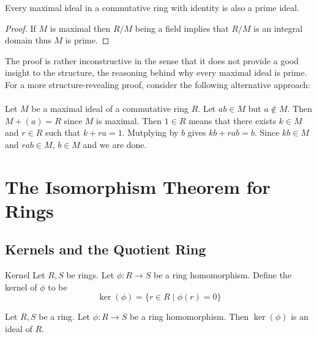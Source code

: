 \documentclass[a4paper]{article}
\begin{document}
\begin{crl}{}{} Every maximal ideal in a commutative ring with identity is also a prime ideal. \tcbline
\begin{proof}
If $M$ is maximal then $R/M$ being a field implies that $R/M$ is an integral domain thus $M$ is prime. 
\end{proof}
\end{crl}

The proof is rather inconstructive in the sense that it does not provide a good insight to the structure, the reasoning behind why every maximal ideal is prime. For a more structure-revealing proof, consider the following alternative approach: \\~\\
Let $M$ be a maximal ideal of a commutative ring $R$. Let $ab\in M$ but $a\notin M$. Then $M+(a)=R$ since $M$ is maximal. Then $1\in R$ means that there exists $k\in M$ and $r\in R$ such that $k+ra=1$. Mutplying by $b$ gives $kb+rab=b$. Since $kb\in M$ and $rab\in M$, $b\in M$ and we are done. 

\pagebreak
\section{The Isomorphism Theorem for Rings}
\subsection{Kernels and the Quotient Ring}
\begin{defn}{Kernel}{} Let $R,S$ be rings. Let $\phi:R\to S$ be a ring homomorphism. Define the kernel of $\phi$ to be $$\ker(\phi)=\{r\in R\;|\;\phi(r)=0\}$$
\end{defn}

\begin{prp}{}{} Let $R,S$ be a ring. Let $\phi:R\to S$ be a ring homomorphism. Then $\ker(\phi)$ is an ideal of $R$. 
\end{prp}
\end{document}
